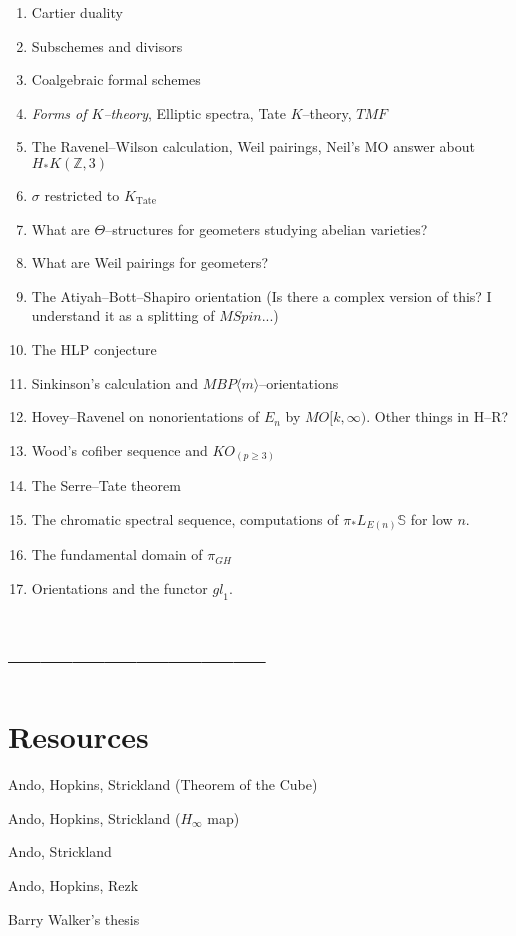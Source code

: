 \documentclass[12pt]{book}
\newcommand{\Z}{\mathbb Z}
\renewcommand{\S}{\mathbb S}
\newcommand{\<}{\langle}
\renewcommand{\>}{\rangle}
\newcommand{\Spin}{\mathit{Spin}}
\newcommand{\TMF}{\mathit{TMF}}
\newcommand{\BP}{\mathit{BP}}
\newcommand{\Tate}{\mathrm{Tate}}
\newcommand{\gl}{\mathit{gl}}
\numberwithin{equation}{section}
\theoremstyle{plain}
\theoremstyle{definition}
\theoremstyle{remark}
\begin{document}
\begin{enumerate}
---------------------
\item Cartier duality
\item Subschemes and divisors
\item Coalgebraic formal schemes
\item \textit{Forms of $K$--theory}, Elliptic spectra, Tate $K$--theory, $\TMF$
\item The Ravenel--Wilson calculation, Weil pairings, Neil's MO answer about $H_* K(\Z, 3)$
\item $\sigma$ restricted to $K_{\Tate}$
\item What are $\Theta$--structures for geometers studying abelian varieties?
\item What are Weil pairings for geometers?
\item The Atiyah--Bott--Shapiro orientation (Is there a complex version of this? I understand it as a splitting of $M\Spin$...)
\item The HLP conjecture
\item Sinkinson's calculation and $M\BP\<m\>$--orientations
\item Hovey--Ravenel on nonorientations of $E_n$ by $MO[k, \infty)$. Other things in H--R?
\item Wood's cofiber sequence and $KO_{(p \ge 3)}$
\item The Serre--Tate theorem
\item The chromatic spectral sequence, computations of $\pi_* L_{E(n)} \S$ for low $n$.
\item The fundamental domain of $\pi_{GH}$
\item Orientations and the functor $\gl_1$.
\end{enumerate}

\section*{------------------------}



\section*{Resources}

Ando, Hopkins, Strickland (Theorem of the Cube)

Ando, Hopkins, Strickland ($H_\infty$ map)

Ando, Strickland

Ando, Hopkins, Rezk

Barry Walker's thesis
\end{document}
